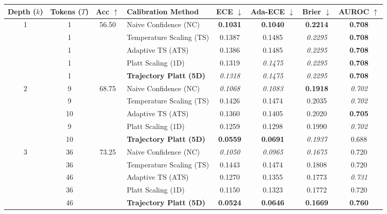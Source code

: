 \begin{table}[t]
\setlength{\tabcolsep}{4pt}
\renewcommand{\arraystretch}{1.05}
\centering
\footnotesize
\begin{tabular}{ccclcccc}
\toprule
\textbf{Depth ($k$)} & \textbf{Tokens ($T$)} & \textbf{Acc} $\uparrow$ & \textbf{Calibration Method} & \textbf{ECE} $\downarrow$ & \textbf{Ada-ECE} $\downarrow$ & \textbf{Brier} $\downarrow$ & \textbf{AUROC} $\uparrow$ \\
\midrule
\multirow{5}{*}{1} & 1 & \multirow{5}{*}{56.50} & Naive Confidence (NC) & \textbf{0.1031} & \textbf{0.1040} & \textbf{0.2214} & \textbf{0.708} \\
 & 1 &  & Temperature Scaling (TS) & 0.1387 & 0.1485 & \textit{0.2295} & \textbf{0.708} \\
 & 1 &  & Adaptive TS (ATS) & 0.1386 & 0.1485 & \textit{0.2295} & \textbf{0.708} \\
 & 1 &  & Platt Scaling (1D) & 0.1319 & \textit{0.1475} & \textit{0.2295} & \textbf{0.708} \\
 & 1 &  & \textbf{Trajectory Platt (5D)} & \textit{0.1318} & \textit{0.1475} & \textit{0.2295} & \textbf{0.708} \\
\midrule
\multirow{5}{*}{2} & 9 & \multirow{5}{*}{68.75} & Naive Confidence (NC) & \textit{0.1068} & \textit{0.1083} & \textbf{0.1918} & \textit{0.702} \\
 & 9 &  & Temperature Scaling (TS) & 0.1426 & 0.1474 & 0.2035 & \textit{0.702} \\
 & 10 &  & Adaptive TS (ATS) & 0.1360 & 0.1405 & 0.2020 & \textbf{0.705} \\
 & 9 &  & Platt Scaling (1D) & 0.1259 & 0.1298 & 0.1990 & \textit{0.702} \\
 & 10 &  & \textbf{Trajectory Platt (5D)} & \textbf{0.0559} & \textbf{0.0691} & \textit{0.1937} & 0.688 \\
\midrule
\multirow{5}{*}{3} & 36 & \multirow{5}{*}{73.25} & Naive Confidence (NC) & \textit{0.1050} & \textit{0.0965} & \textit{0.1675} & 0.720 \\
 & 36 &  & Temperature Scaling (TS) & 0.1443 & 0.1474 & 0.1808 & 0.720 \\
 & 46 &  & Adaptive TS (ATS) & 0.1270 & 0.1355 & 0.1773 & \textit{0.731} \\
 & 36 &  & Platt Scaling (1D) & 0.1150 & 0.1323 & 0.1772 & 0.720 \\
 & 46 &  & \textbf{Trajectory Platt (5D)} & \textbf{0.0524} & \textbf{0.0646} & \textbf{0.1669} & \textbf{0.760} \\
\midrule

\end{tabular}
\end{table}
